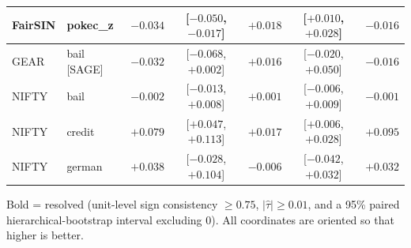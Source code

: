 \begin{table}[t]
\begin{tabular}{llrcrcr}
FairSIN & pokec\_z & $-0.034$ & [$-0.050$, $-0.017$] & $\mathbf{+0.018}$ & [$+0.010$, $+0.028$] & $-0.016$ \\
\midrule
GEAR & bail [SAGE] & $-0.032$ & [$-0.068$, $+0.002$] & $+0.016$ & [$-0.020$, $+0.050$] & $-0.016$ \\
\midrule
NIFTY & bail & $-0.002$ & [$-0.013$, $+0.008$] & $+0.001$ & [$-0.006$, $+0.009$] & $-0.001$ \\
NIFTY & credit & $+0.079$ & [$+0.047$, $+0.113$] & $\mathbf{+0.017}$ & [$+0.006$, $+0.028$] & $+0.095$ \\
NIFTY & german & $+0.038$ & [$-0.028$, $+0.104$] & $-0.006$ & [$-0.042$, $+0.032$] & $+0.032$ \\
\bottomrule
\end{tabular}
\par\smallskip\footnotesize Bold = resolved (unit-level sign consistency $\geq 0.75$, $|\hat\tau| \geq 0.01$, and a 95\% paired hierarchical-bootstrap interval excluding 0). All coordinates are oriented so that higher is better.
\end{table}
